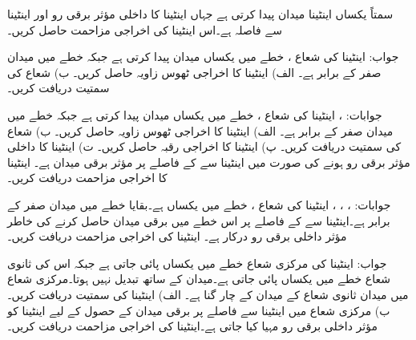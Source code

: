\newpage
{}

سمتاً یکساں اینٹینا  میدان پیدا کرتی ہے جہاں اینٹینا کا داخلی مؤثر برقی رو  اور اینٹینا سے فاصلہ  ہے۔اس اینٹینا کی اخراجی مزاحمت حاصل کریں۔

جواب:
اینٹینا کی شعاع ،  خطے میں یکساں میدان پیدا کرتی ہے جبکہ  خطے میں میدان صفر کے برابر ہے۔ الف) اینٹینا کا اخراجی ٹھوس زاویہ  حاصل کریں۔ ب) شعاع کی سمتیت  دریافت کریں۔

جوابات: ، 
اینٹینا کی شعاع ،  خطے میں یکساں میدان پیدا کرتی ہے جبکہ  خطے میں میدان صفر کے برابر ہے۔ الف) اینٹینا کا اخراجی ٹھوس زاویہ  حاصل کریں۔ ب) شعاع کی سمتیت  دریافت کریں۔ پ) اینٹینا کا اخراجی رقبہ  حاصل کریں۔ ت) اینٹینا کا داخلی مؤثر برقی رو  ہونے کی صورت میں اینٹینا سے  کے فاصلے پر مؤثر برقی 
میدان  ہے۔ اینٹینا کا اخراجی مزاحمت  دریافت کریں۔



جوابات: ، ، ، 
اینٹینا کی شعاع ،  خطے میں یکساں ہے۔بقایا خطے میں میدان صفر کے برابر ہے۔اینٹینا سے  کے فاصلے پر اس خطے میں  برقی میدان حاصل کرنے کی خاطر  مؤثر داخلی برقی رو درکار ہے۔ اینٹینا کی اخراجی مزاحمت  دریافت کریں۔

جواب:
اینٹینا کی مرکزی شعاع   خطے میں یکساں پائی جاتی ہے جبکہ اس کی ثانوی شعاع  خطے میں یکساں پائی جاتی ہے۔میدان  کے ساتھ تبدیل نہیں ہوتا۔مرکزی شعاع میں میدان ثانوی شعاع کے میدان کے چار گنا ہے۔ الف) اینٹینا کی سمتیت  دریافت کریں۔ب) مرکزی شعاع میں اینٹینا سے  فاصلے پر  برقی میدان کے حصول کے لیے اینٹینا کو   مؤثر داخلی برقی رو مہیا کیا جاتی ہے۔اینٹینا کی اخراجی مزاحمت  دریافت کریں۔

